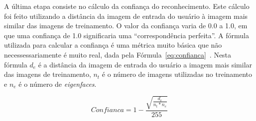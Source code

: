 		A última etapa consiste no cálculo da confiança do reconhecimento. Este cálculo foi feito utilizando a distância da imagem de entrada do usuário à imagem mais similar das imagens de treinamento. O valor da confiança varia de 0.0 a 1.0, em que uma confiança de 1.0 significaria uma ``correspondência perfeita''. A fórmula utilizada para calcular a confiança é uma métrica muito básica que não necessessariamente é muito real, dada pela Fórmula~\ref{eq:confianca}~\cite{shervin}. Nesta fórmula $\displaystyle d_e$ é a distância da imagem de entrada do usuário a imagem mais similar das imagens de treinamento, $\displaystyle n_t$ é o número de imagens utilizadas no treinamento e $\displaystyle n_e$ é o número de \textit{eigenfaces}.


		\begin{equation}
			\label{eq:confianca}
			Confianca = 1 - \frac{\sqrt{\frac{d_e}{n_t * n_e}}}{255}
		\end{equation}





















